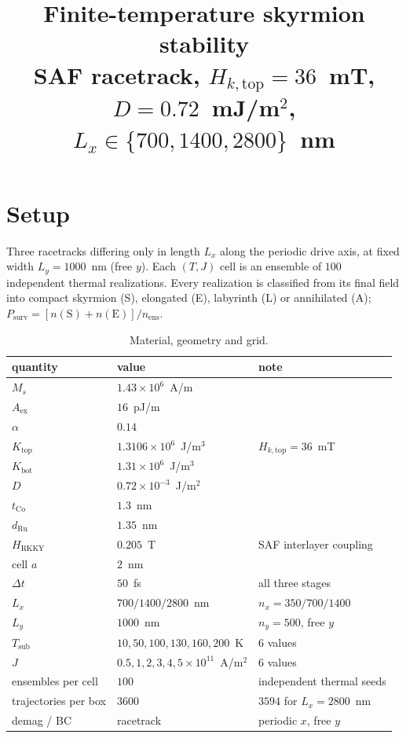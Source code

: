 \documentclass[11pt]{article}
\title{Finite-temperature skyrmion stability\\[2pt]
\large SAF racetrack, $H_{k,\mathrm{top}}=36$~mT, $D=0.72$~mJ/m$^2$,
$L_x\in\{700,1400,2800\}$~nm}
\author{}
\date{}
\begin{document}
\maketitle

\tableofcontents
\clearpage

\section{Setup}
Three racetracks differing only in length $L_x$ along the periodic
drive axis, at fixed width $L_y=1000$~nm (free $y$). Each $(T,J)$ cell
is an ensemble of $100$ independent thermal realizations. Every
realization is classified from its final field into compact skyrmion
(S), elongated (E), labyrinth (L) or annihilated (A);
$P_{\mathrm{surv}}=[n(\mathrm{S})+n(\mathrm{E})]/n_{\mathrm{ens}}$.

\begin{table}[H]
\centering
\caption{Material, geometry and grid.}
\begin{tabular}{lll}
\toprule
quantity & value & note\\
\midrule
$M_s$                 & $1.43\times10^{6}$~A/m & \\
$A_{\mathrm{ex}}$     & $16$~pJ/m & \\
$\alpha$              & $0.14$ & \\
$K_{\mathrm{top}}$    & $1.3106\times10^{6}$~J/m$^3$
                      & $H_{k,\mathrm{top}}=36$~mT\\
$K_{\mathrm{bot}}$    & $1.31\times10^{6}$~J/m$^3$ & \\
$D$                   & $0.72\times10^{-3}$~J/m$^2$ & \\
$t_{\mathrm{Co}}$     & $1.3$~nm & \\
$d_{\mathrm{Ru}}$     & $1.35$~nm & \\
$H_{\mathrm{RKKY}}$   & $0.205$~T & SAF interlayer coupling\\
cell $a$              & $2$~nm & \\
$\Delta t$            & $50$~fs & all three stages\\
$L_x$                 & $700 / 1400 / 2800$~nm
                      & $n_x = 350 / 700 / 1400$\\
$L_y$                 & $1000$~nm & $n_y = 500$, free $y$\\
$T_{\mathrm{sub}}$    & $10, 50, 100, 130, 160, 200$~K & 6 values\\
$J$                   & $0.5, 1, 2, 3, 4, 5\times10^{11}$~A/m$^2$
                      & 6 values\\
ensembles per cell    & $100$ & independent thermal seeds\\
trajectories per box  & $3600$
                      & $3594$ for $L_x=2800$~nm\\
demag / BC            & racetrack & periodic $x$, free $y$\\
\bottomrule
\end{tabular}
\end{table}
\end{document}
